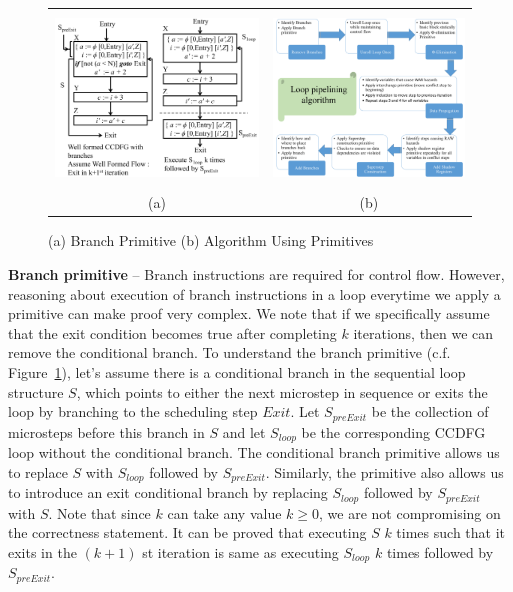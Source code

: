\begin{figure}[H]
\begin{center}
\begin{tabular}{cc}
\includegraphics[height=1.8in]{fig-proposal/conditional-branch-primitive}
& 
\includegraphics[height=1.8in]{fig-proposal/algorithm-using-primitives}
\\
(a) &  (b) 
\end{tabular}
\end{center}
\caption{(a) Branch Primitive (b) Algorithm Using Primitives}
\label{fig:branch-primitive}
\end{figure}

{\textbf {Branch primitive}} -- Branch instructions are required for control flow. However, reasoning about 
execution of branch instructions in a loop everytime we apply a primitive can make proof very complex.
We note that if we specifically assume that the exit condition becomes true after completing $k$ iterations, then we can remove the conditional branch.
To understand the branch primitive (c.f. Figure~\ref{fig:branch-primitive}), 
let's assume there is a conditional branch in the sequential loop structure $S$, which points to either
the next microstep in sequence or exits the loop by branching to the scheduling step
$Exit$. Let $S_{preExit}$ be the collection of microsteps before this branch in $S$ and
let $S_{loop}$ be the corresponding CCDFG loop without the conditional branch.
The conditional branch primitive allows us to replace $S$ with $S_{loop}$ followed by
$S_{preExit}$. Similarly,
the primitive also allows us to introduce an exit conditional branch by replacing
$S_{loop}$ followed by $S_{preExit}$ with $S$.
Note that since $k$ can take any value $k \ge 0$, we are not compromising on the correctness statement.  
It can be proved that executing $S$ $k$ times such that it exits in the $(k+1)$ st
iteration is same as executing $S_{loop}$ $k$ times followed by $S_{preExit}$.

